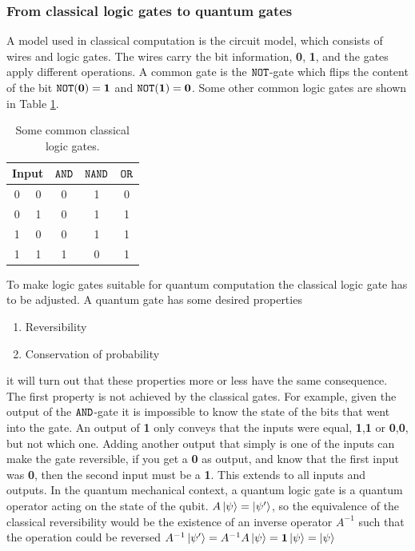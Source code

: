 \subsubsection{From classical logic gates to quantum gates}
A model used in classical computation is the circuit model, which consists of wires and logic gates. The wires carry the bit information, \textbf{0}, \textbf{1}, and the gates apply different operations. A common gate is the ${\tt NOT}$-gate which flips the content of the bit ${\tt NOT}(\textbf{0}) = \textbf{1}$ and ${\tt NOT}(\textbf{1}) = \textbf{0}$. Some other common logic gates are shown in Table \ref{tab:gates}. 

\begin{table}[h]
    \centering
    \begin{tabular}{|c|c|c|c|c|}
    \hline
    \multicolumn{2}{|c|}{Input} & ${\tt AND}$ & ${\tt NAND}$ & ${\tt OR}$\\
    \hline
    0 & 0 & 0& 1& 0\\
    0 & 1 & 0& 1& 1\\
    1 & 0 & 0& 1& 1\\
    1 & 1 & 1& 0& 1\\
    \hline
    \end{tabular}
    \caption{Some common classical logic gates.}
    \label{tab:gates}
\end{table}


To make logic gates suitable for quantum computation the classical logic gate has to be adjusted. A quantum gate has some desired properties
\begin{enumerate}
\item Reversibility 
\item Conservation of probability
\end{enumerate}
it will turn out that these properties more or less have the same consequence. The first property is not achieved by the classical gates. For example, given the output of the ${\tt AND}$-gate it is impossible to know the state of the bits that went into the gate. An output of \textbf{1} only conveys that the inputs were equal, \textbf{1},\textbf{1} or \textbf{0},\textbf{0}, but not which one. Adding another output that simply is one of the inputs can make the gate reversible, if you get a \textbf{0} as output, and know that the first input was \textbf{0}, then the second input must be a \textbf{1}. This extends to all inputs and outputs. In the quantum mechanical context, a quantum logic gate is a quantum operator acting on the state of the qubit. $A\ket{\psi} = \ket{\psi'}$, so the equivalence of the classical reversibility would be the existence of an inverse operator $A^{-1}$ such that the operation could be reversed $A^{-1}\ket{\psi'} = A^{-1}A\ket{\psi} = \mathbf{1}\ket{\psi} = \ket{\psi}$

